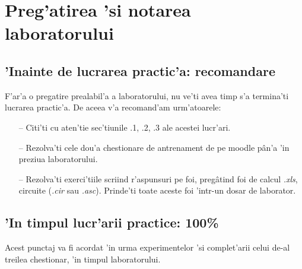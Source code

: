 \section{Preg'atirea 'si notarea laboratorului}


\subsection*{'Inainte de lucrarea practic'a: recomandare}

F'ar'a o pregatire prealabil'a a laboratorului, nu ve'ti avea timp s'a termina'ti lucrarea practic'a. De aceea v'a recomand'am urm'atoarele:

\begin{itemize}
\item[--] Citi'ti cu aten'tie sec'tiunile \thechapter.1, \thechapter.2, \thechapter.3 ale acestei lucr'ari.
\item[--] Rezolva'ti cele dou'a chestionare de antrenament de pe moodle p\^an'a 'in preziua laboratorului.
\item[--] Rezolva'ti exerci'tiile scriind r'aspunsuri pe foi, preg\^atind foi de calcul \textit{.xls}, circuite (\textit{.cir} sau \textit{.asc}). Prinde'ti toate aceste foi 'intr-un dosar de laborator.
\end{itemize}

%
%

\subsection*{'In timpul lucr'arii practice: 100\%}
Acest punctaj va fi acordat 'in urma experimentelor 'si complet'arii celui de-al treilea chestionar, 'in timpul laboratorului.

